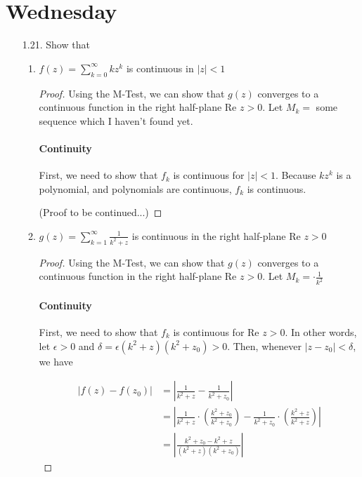 \documentclass[11pt]{article}
\begin{document}
\section*{Wednesday}
\begin{enumerate}
	\item[1.21.] Show that
	
	\begin{enumerate}
		\item $f(z) = \sum^{\infty}_{k=0} kz^k$ is continuous in $|z| < 1$
		
		\begin{proof}
			Using the M-Test, we can show that $g(z)$ converges to a continuous function in the right half-plane Re $z > 0$. Let $M_k = $ some sequence which I haven't found yet.
			
			\paragraph{Continuity} First, we need to show that $f_k$ is continuous for $|z| < 1$. Because $kz^k$ is a polynomial, and polynomials are continuous, $f_k$ is continuous.
			
			(Proof to be continued...)
			
		\end{proof}
		
		\item $g(z) = \sum^{\infty}_{k=1} \frac{1}{k^2 + z}$ is continuous in the right half-plane Re $z > 0$
		
		\begin{proof}
			Using the M-Test, we can show that $g(z)$ converges to a continuous function in the right half-plane Re $z > 0$. Let $M_k = \cdot \frac{1}{k^2}$
			
			\paragraph{Continuity} First, we need to show that $f_k$ is continuous for Re $z > 0$. In other words, let $\epsilon > 0$ and $\delta = \epsilon(k^2 + z)(k^2 + z_0) > 0$. Then, whenever $|z - z_0| < \delta$, we have
			
			\[\begin{aligned}
			| f(z) - f(z_0) |
			&= |\frac{1}{k^2 + z} - \frac{1}{k^2 + z_0}| \\
			&= |\frac{1}{k^2 + z} \cdot (\frac{k^2 + z_0}{k^2 + z_0}) - \frac{1}{k^2 + z_0} \cdot (\frac{k^2 + z}{k^2 + z})| \\
			&= |\frac{k^2 + z_0 - k^2 + z}{(k^2 + z)(k^2 + z_0)}|
			\end{aligned}\]
			

\end{proof}
\end{enumerate}
\end{enumerate}
\end{document}
